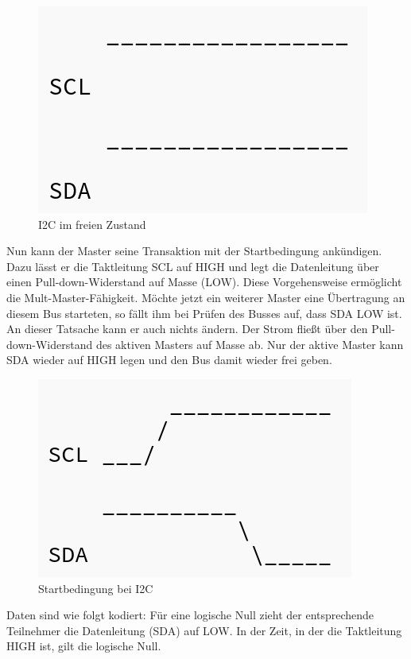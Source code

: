 \begin{figure}[h!] 
\includegraphics[scale=0.3]{bilder/i2c_frei}
\caption[I2C im freien Zustand]{\ac{I2C} im freien Zustand \cite{cc}}
\label{i2c_frei}
\end{figure}

Nun kann der Master seine Transaktion mit der Startbedingung ankündigen. Dazu lässt er die Taktleitung SCL auf HIGH und legt die Datenleitung über einen Pull-down-Widerstand auf Masse (LOW). Diese Vorgehensweise ermöglicht die Mult-Master-Fähigkeit. Möchte jetzt ein weiterer Master eine Übertragung an diesem Bus starteten, so fällt ihm bei Prüfen des Busses auf, dass SDA LOW ist. An dieser Tatsache kann er auch nichts ändern. Der Strom fließt über den Pull-down-Widerstand des aktiven Masters auf Masse ab. Nur der aktive Master kann SDA wieder auf HIGH legen und den Bus damit wieder frei geben.  

\begin{figure}[h!] 
\includegraphics[scale=0.3]{bilder/i2c_start}
\caption[Startbedingung I2C]{Startbedingung bei \ac{I2C} \cite{cc}}
\label{i2c_start}
\end{figure}

Daten sind wie folgt kodiert: Für eine logische Null zieht der entsprechende Teilnehmer die Datenleitung (SDA) auf LOW. In der Zeit, in der die Taktleitung HIGH ist, gilt die logische Null. 

